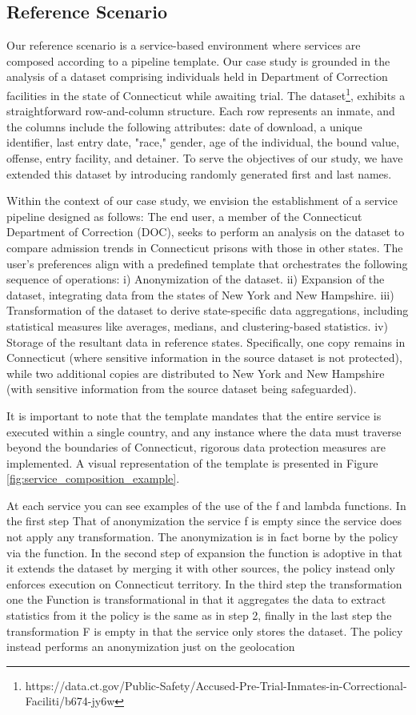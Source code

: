 \subsection{Reference Scenario}
Our reference scenario is a service-based environment where services are composed according to a pipeline template.
Our case study is grounded in the analysis of a dataset comprising individuals held in Department of Correction facilities in the state of Connecticut while awaiting trial.
The dataset\footnote{https://data.ct.gov/Public-Safety/Accused-Pre-Trial-Inmates-in-Correctional-Faciliti/b674-jy6w}, exhibits a straightforward row-and-column structure.
Each row represents an inmate, and the columns include the following attributes: date of download, a unique identifier, last entry date, "race," gender, age of the individual, the bound value, offense, entry facility, and detainer.
To serve the objectives of our study, we have extended this dataset by introducing randomly generated first and last names.

Within the context of our case study, we envision the establishment of a service pipeline designed as follows:
The end user, a member of the Connecticut Department of Correction (DOC),
seeks to perform an analysis on the dataset to compare admission trends in Connecticut prisons with those in other states.
The user's preferences align with a predefined template that orchestrates the following sequence of operations:
i) Anonymization of the dataset.
ii) Expansion of the dataset, integrating data from the states of New York and New Hampshire.
iii) Transformation of the dataset to derive state-specific data aggregations, including statistical measures like averages, medians, and clustering-based statistics.
iv) Storage of the resultant data in reference states. Specifically, one copy remains in Connecticut (where sensitive information in the source dataset is not protected), while two additional copies are distributed to New York and New Hampshire (with sensitive information from the source dataset being safeguarded).

It is important to note that the template mandates that the entire service is executed within a single country, and any instance where the data must traverse beyond the boundaries of Connecticut, rigorous data protection measures are implemented.
A visual representation of the template is presented in Figure \ref{fig:service_composition_example}.

At each service you can see examples of the use of the f and lambda functions.
In the first step That of anonymization the service f is empty since the service does not apply any transformation.
The anonymization is in fact borne by the policy via the \myLambda function.
In the second step of expansion the function is adoptive in that it extends the dataset by merging it with other sources, the policy instead only enforces execution on Connecticut territory.
In the third step the transformation one the Function is transformational in that it aggregates the data to extract statistics from it the policy is the same as in step 2, finally in the last step the transformation F is empty in that the service only stores the dataset.
The policy instead performs an anonymization just on the geolocation



